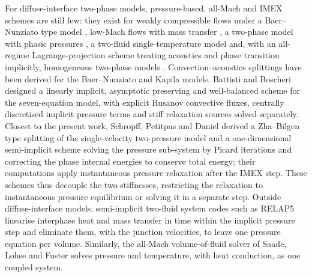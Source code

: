 \documentclass[a4paper,fleqn]{cas-sc}
\begin{document}
For diffuse-interface two-phase models, pressure-based, all-Mach and IMEX schemes are still few: they exist for weakly
compressible flows under a Baer--Nunziato type model \cite{ReAbgrall2022}, low-Mach flows with mass transfer
\cite{Demou2022}, a two-phase model with phasic pressures \cite{MalusaAlaia2024}, a two-fluid single-temperature model
\cite{Lukacova2024} and, with an all-regime Lagrange-projection scheme treating acoustics and phase transition
implicitly, homogeneous two-phase models \cite{ChalonsGirardinKokh2017}. Con\-vec\-tion--acous\-tics splittings have been
derived for the Baer--Nunziato \cite{TokarevaToro2017} and Kapila \cite{tenEikelder2017} models. Battisti and Boscheri
\cite{BattistiBoscheri2025} designed a linearly implicit, asymptotic preserving and well-balanced scheme for the
seven-equation model, with explicit Rusanov convective fluxes, centrally discretised implicit pressure terms and stiff
relaxation sources solved separately. Closest to the present work, Schropff, Petitpas and Daniel \cite{Schropff2026}
derived a Zha--Bilgen type splitting of the single-velocity two-pressure model and a one-dimensional semi-implicit
scheme solving the pressure sub-system by Picard iterations and correcting the phase internal energies to conserve total
energy; their computations apply instantaneous pressure relaxation after the IMEX step. These schemes thus decouple the
two stiffnesses, restricting the relaxation to instantaneous pressure equilibrium or solving it in a separate step.
Outside diffuse-interface models, semi-implicit two-fluid system codes such as RELAP5 \cite{RELAP5} linearise interphase
heat and mass transfer in time within the implicit pressure step and eliminate them, with the junction velocities, to
leave one pressure equation per volume. Similarly, the all-Mach volume-of-fluid solver of Saade, Lohse and Fuster
\cite{Saade2023} solves pressure and temperature, with heat conduction, as one coupled system.
\end{document}
